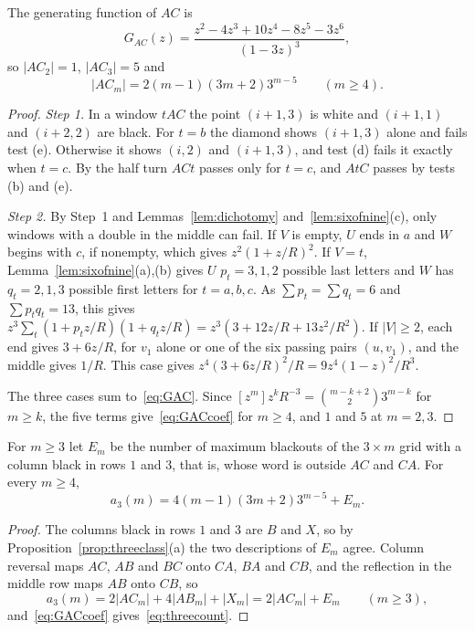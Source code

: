 \begin{proposition}\label{prop:threeGAC}
The generating function of $AC$ is
\begin{equation}\label{eq:GAC}
G_{AC}(z)=\frac{z^2-4z^3+10z^4-8z^5-3z^6}{(1-3z)^3},
\end{equation}
so $|AC_2|=1$, $|AC_3|=5$ and
\begin{equation}\label{eq:GACcoef}
|AC_m|=2(m-1)(3m+2)3^{m-5}\qquad(m\ge4).
\end{equation}
\end{proposition}

\begin{proof}
\emph{Step 1.} In a window $tAC$ the point $(i+1,3)$ is white and $(i+1,1)$ and $(i+2,2)$ are
black. For $t=b$ the diamond shows $(i+1,3)$ alone and fails test (e). Otherwise it shows
$(i,2)$ and $(i+1,3)$, and test (d) fails it exactly when $t=c$. By the half turn $ACt$ passes
only for $t=c$, and $AtC$ passes by tests (b) and (e).

\emph{Step 2.} By Step~1 and Lemmas~\ref{lem:dichotomy} and~\ref{lem:sixofnine}(c), only windows with a
double in the middle can fail. If $V$ is empty, $U$ ends in $a$ and $W$ begins with $c$, if
nonempty, which gives $z^2(1+z/R)^2$. If $V=t$, Lemma~\ref{lem:sixofnine}(a),(b) gives $U$ $p_t=3,1,2$ possible last letters and $W$
has $q_t=2,1,3$ possible first letters for $t=a,b,c$. As $\sum p_t=\sum q_t=6$ and
$\sum p_tq_t=13$, this gives $z^3\sum_t(1+p_tz/R)(1+q_tz/R)=z^3(3+12z/R+13z^2/R^2)$. If $|V|\ge2$,
each end gives $3+6z/R$, for $v_1$ alone or one of the six passing pairs $(u,v_1)$, and the
middle gives $1/R$. This case gives $z^4(3+6z/R)^2/R=9z^4(1-z)^2/R^3$.

The three cases sum to~\eqref{eq:GAC}. Since $[z^m]z^kR^{-3}=\binom{m-k+2}23^{m-k}$
for $m\ge k$, the five terms give~\eqref{eq:GACcoef} for $m\ge4$, and $1$ and $5$ at $m=2,3$.
\end{proof}

\begin{theorem}\label{thm:threecount}
For $m\ge3$ let $E_m$ be the number of maximum blackouts of the $3\times m$ grid with a column
black in rows $1$ and $3$, that is, whose word is outside $AC$ and $CA$. For every $m\ge4$,
\begin{equation}\label{eq:threecount}
a_3(m)=4(m-1)(3m+2)3^{m-5}+E_m.
\end{equation}
\end{theorem}

\begin{proof}
The columns black in rows $1$ and $3$ are $B$ and $X$, so by Proposition~\ref{prop:threeclass}(a) the two descriptions of $E_m$ agree.
Column reversal maps $AC$, $AB$ and $BC$ onto $CA$, $BA$ and $CB$, and the reflection in the
middle row maps $AB$ onto $CB$, so
\begin{equation}\label{eq:classsum}
a_3(m)=2|AC_m|+4|AB_m|+|X_m|=2|AC_m|+E_m\qquad(m\ge3),
\end{equation}
and~\eqref{eq:GACcoef} gives~\eqref{eq:threecount}.
\end{proof}

